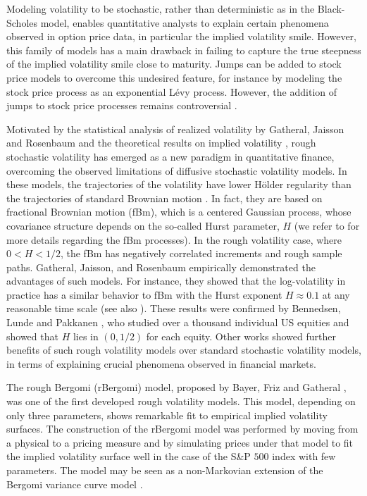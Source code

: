 Modeling volatility to be stochastic, rather than deterministic as in the Black-Scholes model, enables quantitative analysts to  explain certain phenomena observed in option price data, in particular the implied volatility smile. However, this family of models has a  main drawback in failing  to capture the true steepness of the implied volatility smile close to maturity. Jumps can be added to stock price models to overcome this undesired feature, for instance by modeling the stock price process as an exponential L\'evy process. However, the addition of jumps to stock price processes remains controversial \cite{christensen2014fact,bajgrowicz2015jumps}. 

Motivated by the statistical analysis of realized volatility by Gatheral, Jaisson and Rosenbaum \cite{gatheral2018volatility} and the theoretical results on implied volatility    \cite{alos2007short,fukasawa2011asymptotic}, rough stochastic volatility has emerged as a new paradigm in quantitative finance, overcoming the observed limitations of  diffusive stochastic volatility models. In these models, the trajectories of the volatility  have lower H\"older regularity than the trajectories of standard Brownian motion \cite{bayer2016pricing,gatheral2018volatility}. In fact, they are based on fractional Brownian motion (fBm), which  is a centered Gaussian process, whose covariance structure depends on  the so-called Hurst parameter, $H$ (we refer to  \cite{mandelbrot1968fractional,coutin07introduction,biagini2008stochastic} for more details regarding the fBm processes). In the rough volatility case, where $0<H<1/2$, the fBm has negatively correlated increments and rough sample paths.   Gatheral, Jaisson, and Rosenbaum \cite{gatheral2018volatility}  empirically demonstrated the advantages of such models. For instance, they showed that the log-volatility in practice has a similar behavior to  fBm with the Hurst exponent $H \approx 0.1$ at any reasonable time scale (see also  \cite{gatheral2014volatility_2}).  These results were confirmed  by Bennedsen, Lunde and Pakkanen \cite{bennedsen2016decoupling}, who studied over a thousand individual US equities and showed that $H$ lies in $(0,1/2)$ for each equity. Other  works \cite{bennedsen2016decoupling,bayer2016pricing,gatheral2018volatility} showed further benefits of  such rough volatility models over  standard stochastic volatility models,   in terms of explaining crucial phenomena  observed in  financial markets.

The rough Bergomi (rBergomi) model, proposed by Bayer, Friz and Gatheral \cite{bayer2016pricing}, was one of the first developed rough volatility models. This model, depending on only three parameters, shows remarkable fit to empirical implied volatility surfaces. The construction of the rBergomi model was performed by  moving from a physical to a pricing measure and by simulating prices under that model to fit  the implied volatility surface well in the case of the S\&P $500$ index with few parameters. The model may be seen as a non-Markovian extension of the Bergomi variance curve model \cite{bergomi2005smile}.

